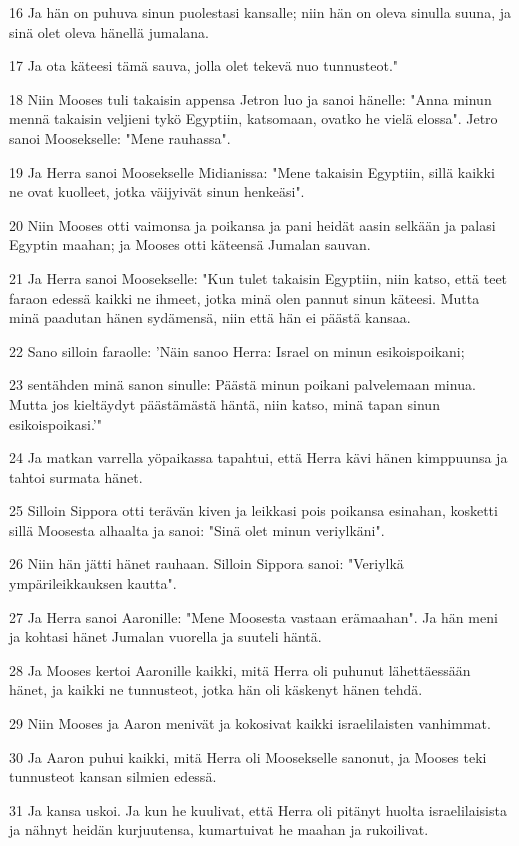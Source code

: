 \par 16 Ja hän on puhuva sinun puolestasi kansalle; niin hän on oleva sinulla suuna, ja sinä olet oleva hänellä jumalana.
\par 17 Ja ota käteesi tämä sauva, jolla olet tekevä nuo tunnusteot."
\par 18 Niin Mooses tuli takaisin appensa Jetron luo ja sanoi hänelle: "Anna minun mennä takaisin veljieni tykö Egyptiin, katsomaan, ovatko he vielä elossa". Jetro sanoi Moosekselle: "Mene rauhassa".
\par 19 Ja Herra sanoi Moosekselle Midianissa: "Mene takaisin Egyptiin, sillä kaikki ne ovat kuolleet, jotka väijyivät sinun henkeäsi".
\par 20 Niin Mooses otti vaimonsa ja poikansa ja pani heidät aasin selkään ja palasi Egyptin maahan; ja Mooses otti käteensä Jumalan sauvan.
\par 21 Ja Herra sanoi Moosekselle: "Kun tulet takaisin Egyptiin, niin katso, että teet faraon edessä kaikki ne ihmeet, jotka minä olen pannut sinun käteesi. Mutta minä paadutan hänen sydämensä, niin että hän ei päästä kansaa.
\par 22 Sano silloin faraolle: 'Näin sanoo Herra: Israel on minun esikoispoikani;
\par 23 sentähden minä sanon sinulle: Päästä minun poikani palvelemaan minua. Mutta jos kieltäydyt päästämästä häntä, niin katso, minä tapan sinun esikoispoikasi.'"
\par 24 Ja matkan varrella yöpaikassa tapahtui, että Herra kävi hänen kimppuunsa ja tahtoi surmata hänet.
\par 25 Silloin Sippora otti terävän kiven ja leikkasi pois poikansa esinahan, kosketti sillä Moosesta alhaalta ja sanoi: "Sinä olet minun veriylkäni".
\par 26 Niin hän jätti hänet rauhaan. Silloin Sippora sanoi: "Veriylkä ympärileikkauksen kautta".
\par 27 Ja Herra sanoi Aaronille: "Mene Moosesta vastaan erämaahan". Ja hän meni ja kohtasi hänet Jumalan vuorella ja suuteli häntä.
\par 28 Ja Mooses kertoi Aaronille kaikki, mitä Herra oli puhunut lähettäessään hänet, ja kaikki ne tunnusteot, jotka hän oli käskenyt hänen tehdä.
\par 29 Niin Mooses ja Aaron menivät ja kokosivat kaikki israelilaisten vanhimmat.
\par 30 Ja Aaron puhui kaikki, mitä Herra oli Moosekselle sanonut, ja Mooses teki tunnusteot kansan silmien edessä.
\par 31 Ja kansa uskoi. Ja kun he kuulivat, että Herra oli pitänyt huolta israelilaisista ja nähnyt heidän kurjuutensa, kumartuivat he maahan ja rukoilivat.

